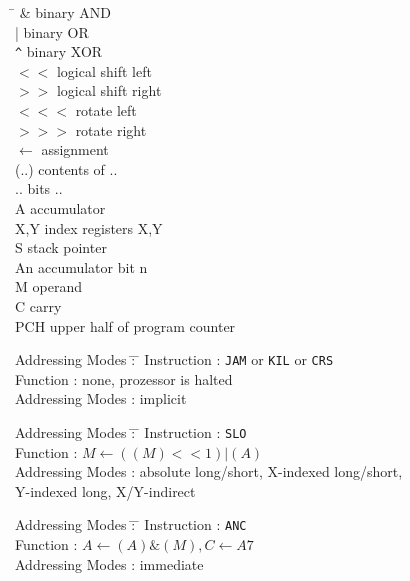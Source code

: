 \documentclass[12pt,twoside]{report}
\newcommand{\tty}[1]{{\tt #1}}
\begin{document}
\begin{tabbing}
\hspace{2cm} \= \kill
\&           \> binary AND \\
|            \> binary OR \\
\verb!^!     \> binary XOR \\
$<<$         \> logical shift left \\
$>>$         \> logical shift right \\
$<<<$        \> rotate left \\
$>>>$        \> rotate right \\
$\leftarrow$ \> assignment \\
 (..)        \> contents of .. \\
 {..}        \> bits .. \\
 A           \> accumulator \\
 X,Y         \> index registers X,Y \\
 S           \> stack pointer \\
 An          \> accumulator bit n \\
 M           \> operand \\
 C           \> carry \\
 PCH         \> upper half of program counter \\
\end{tabbing}

\begin{tabbing}
Addressing Modes \= : \= \kill 
Instruction      \> : \> \tty{JAM} or \tty{KIL} or \tty{CRS} \\
Function         \> : \> none, prozessor is halted \\
Addressing Modes \> : \> implicit \\
\end{tabbing}

\begin{tabbing}
Addressing Modes \= : \= \kill 
Instruction      \> : \> \tty{SLO} \\
Function         \> : \> $M\leftarrow((M)<<1)|(A)$ \\
Addressing Modes \> : \> absolute long/short, X-indexed long/short, \\
                 \>   \> Y-indexed long, X/Y-indirect \\
\end{tabbing}

\begin{tabbing}
Addressing Modes \= : \= \kill 
Instruction      \> : \> \tty{ANC} \\
Function         \> : \> $A\leftarrow(A)\&(M), C\leftarrow A7$ \\
Addressing Modes \> : \> immediate \\
\end{tabbing}
\end{document}
